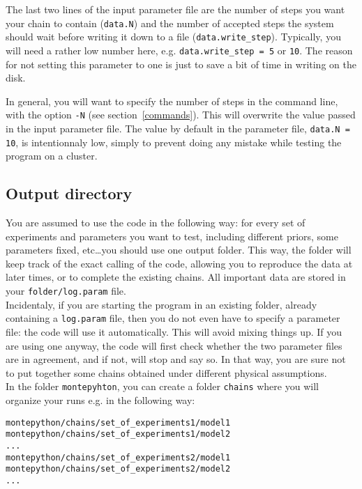 \documentclass[10pt]{article}
\begin{document}
  The last two lines of the input parameter file are the number of steps you want your chain to contain
  (\verb?data.N?) and the number of accepted steps the system should wait
  before writing it down to a file (\verb?data.write_step?). Typically, you
  will need a rather low number here, e.g. \verb?data.write_step = 5? or \verb?10?. The reason for not setting this parameter to one is just to save a bit of time in writing on the disk.
 
  In general, you will want to specify the number of steps in the command line,
  with the option \verb?-N? (see section~\ref{commands}). This will overwrite the value passed in the input parameter file. The value by default in the parameter file, \verb?data.N = 10?,
  is intentionnaly low, 
  simply to prevent doing any mistake while testing the program on a cluster.


\subsection{Output directory}

You are assumed to use the code in the following way: for every set of
  experiments and parameters you want to test, including different priors, some
  parameters fixed, etc\ldots you should use one output folder. This way, the folder
  will keep track of the exact calling of the code, allowing you to reproduce
  the data at later times, or to complete the existing chains. All 
  important data are stored in your \verb?folder/log.param? file.\\

  Incidentaly, if you are starting the program in an existing folder, already
  containing a \verb?log.param? file, then you do not even have to specify a
  parameter file: the code will use it automatically. This will avoid mixing
  things up. If you are using one anyway, the code will first check whether the
  two parameter files are in agreement, and if not, will stop and say so. In that way, you are sure not to put together some chains obtained under different physical assumptions.\\
  
  In the folder \verb?montepyhton?, you can create a folder \verb?chains? where you will organize your runs e.g. in the following way:
    \begin{alltt}
    montepython/chains/set_of_experiments1/model1
    montepython/chains/set_of_experiments1/model2
    ...
        montepython/chains/set_of_experiments2/model1
            montepython/chains/set_of_experiments2/model2    
  ...
  \end{alltt}
  
\end{document}
